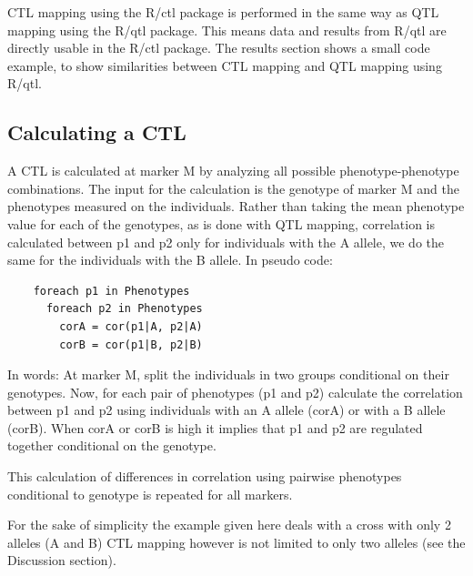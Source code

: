 
  CTL mapping using the R/ctl package is performed in the same way as QTL mapping using the R/qtl \cite{Broman:2003, Arends:2010} 
  package. This means data and results from R/qtl are directly usable in the R/ctl package. The results section shows a small code 
  example, to show similarities between CTL mapping and QTL mapping using R/qtl.

\subsection{Calculating a CTL}
  A CTL is calculated at marker M by analyzing all possible phenotype-phenotype combinations. The input for the calculation is 
  the genotype of marker M and the phenotypes measured on the individuals. Rather than taking the mean phenotype value for each 
  of the genotypes, as is done with QTL mapping, correlation is calculated between p1 and p2 only for individuals with the 
  A allele, we do the same for the individuals with the B allele. In pseudo code:
\begin{verbatim}
    foreach p1 in Phenotypes
      foreach p2 in Phenotypes
        corA = cor(p1|A, p2|A)
        corB = cor(p1|B, p2|B)
\end{verbatim}
  In words: At marker M, split the individuals in two groups conditional on their genotypes. Now, for each pair of phenotypes 
  (p1 and p2) calculate the correlation between p1 and p2 using individuals with an A allele (corA) or with a B allele (corB). 
  When corA or corB is high it implies that p1 and p2 are regulated together conditional on the genotype.

  This calculation of differences in correlation using pairwise phenotypes conditional to genotype is repeated for all markers.

  For the sake of simplicity the example given here deals with a cross with only 2 alleles (A and B) CTL mapping however is not 
  limited to only two alleles (see the Discussion section).

